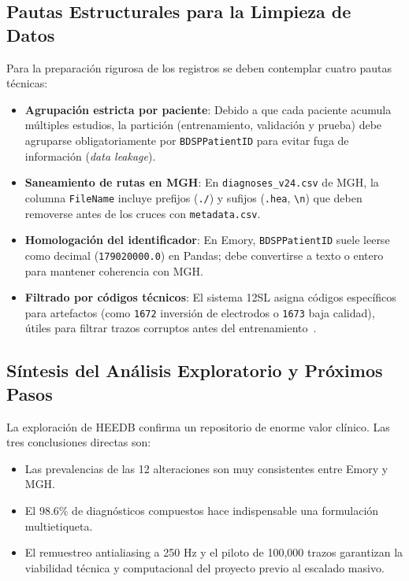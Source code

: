\documentclass[11pt,a4paper]{article}
\begin{document}
\subsection{Pautas Estructurales para la Limpieza de Datos}
Para la preparación rigurosa de los registros se deben contemplar cuatro pautas técnicas:
\begin{itemize}[topsep=1pt, itemsep=1pt, parsep=0pt]
    \item \textbf{Agrupación estricta por paciente}: Debido a que cada paciente acumula múltiples estudios, la partición (entrenamiento, validación y prueba) debe agruparse obligatoriamente por \texttt{BDSPPatientID} para evitar fuga de información (\textit{data leakage}).
    \item \textbf{Saneamiento de rutas en MGH}: En \texttt{diagnoses\_v24.csv} de MGH, la columna \texttt{FileName} incluye prefijos (\texttt{./}) y sufijos (\texttt{.hea}, \texttt{\textbackslash n}) que deben removerse antes de los cruces con \texttt{metadata.csv}.
    \item \textbf{Homologación del identificador}: En Emory, \texttt{BDSPPatientID} suele leerse como decimal (\texttt{179020000.0}) en Pandas; debe convertirse a texto o entero para mantener coherencia con MGH.
    \item \textbf{Filtrado por códigos técnicos}: El sistema 12SL asigna códigos específicos para artefactos (como \texttt{1672} inversión de electrodos o \texttt{1673} baja calidad), útiles para filtrar trazos corruptos antes del entrenamiento~\cite{koscova2024}.
\end{itemize}

\subsection{Síntesis del Análisis Exploratorio y Próximos Pasos}
La exploración de HEEDB confirma un repositorio de enorme valor clínico. Las tres conclusiones directas son:
\begin{itemize}[topsep=1pt, itemsep=1pt, parsep=0pt]
    \item Las prevalencias de las 12 alteraciones son muy consistentes entre Emory y MGH.
    \item El 98.6\% de diagnósticos compuestos hace indispensable una formulación multietiqueta.
    \item El remuestreo antialiasing a 250 Hz y el piloto de 100,000 trazos garantizan la viabilidad técnica y computacional del proyecto previo al escalado masivo.
\end{itemize}
\newpage
\end{document}

